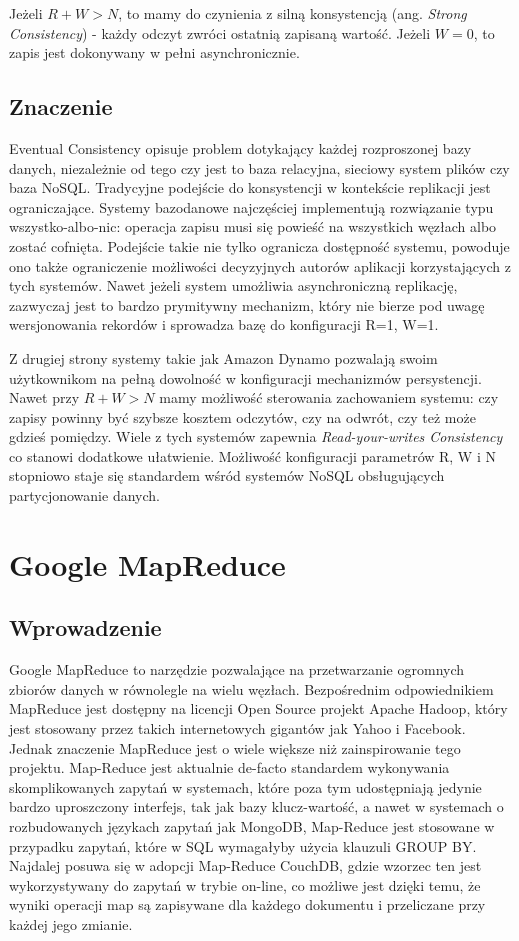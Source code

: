 Jeżeli $R+W>N$, to mamy do czynienia z silną konsystencją (ang. \emph{Strong Consistency}) - każdy odczyt zwróci ostatnią zapisaną wartość.
Jeżeli $W = 0$, to zapis jest dokonywany w pełni asynchronicznie.

\subsection*{Znaczenie}

Eventual Consistency opisuje problem dotykający każdej rozproszonej bazy danych, niezależnie od tego czy jest to baza relacyjna, sieciowy system plików czy baza NoSQL.
Tradycyjne podejście do konsystencji w kontekście replikacji jest ograniczające.
Systemy bazodanowe najczęściej implementują rozwiązanie typu wszystko-albo-nic: operacja zapisu musi się powieść na wszystkich węzłach albo zostać cofnięta.
Podejście takie nie tylko ogranicza dostępność systemu, powoduje ono także ograniczenie możliwości decyzyjnych autorów aplikacji korzystających z tych systemów.
Nawet jeżeli system umożliwia asynchroniczną replikację, zazwyczaj jest to bardzo prymitywny mechanizm, który nie bierze pod uwagę wersjonowania rekordów i sprowadza bazę do konfiguracji R=1, W=1.

Z drugiej strony systemy takie jak Amazon Dynamo pozwalają swoim użytkownikom na pełną dowolność w konfiguracji mechanizmów persystencji.
Nawet przy $R+W>N$ mamy możliwość sterowania zachowaniem systemu: czy zapisy powinny być szybsze kosztem odczytów, czy na odwrót, czy też może gdzieś pomiędzy.
Wiele z tych systemów zapewnia \emph{Read-your-writes Consistency} co stanowi dodatkowe ułatwienie.
Możliwość konfiguracji parametrów R, W i N stopniowo staje się standardem wśród systemów NoSQL obsługujących partycjonowanie danych.

\section{Google MapReduce}
\label{sec:google-map-reduce}

\subsection*{Wprowadzenie}

Google MapReduce to narzędzie pozwalające na przetwarzanie ogromnych zbiorów danych w równolegle na wielu węzłach.
Bezpośrednim odpowiednikiem MapReduce jest dostępny na licencji Open Source projekt Apache Hadoop, który jest stosowany przez takich internetowych gigantów jak Yahoo i Facebook.
Jednak znaczenie MapReduce jest o wiele większe niż zainspirowanie tego projektu.
Map-Reduce jest aktualnie de-facto standardem wykonywania skomplikowanych zapytań w systemach, które poza tym udostępniają jedynie bardzo uproszczony interfejs, tak jak bazy klucz-wartość, a nawet w systemach o rozbudowanych językach zapytań jak MongoDB, Map-Reduce jest stosowane w przypadku zapytań, które w SQL wymagałyby użycia klauzuli GROUP BY.
Najdalej posuwa się w adopcji Map-Reduce CouchDB, gdzie wzorzec ten jest wykorzystywany do zapytań w trybie on-line, co możliwe jest dzięki temu, że wyniki operacji map są zapisywane dla każdego dokumentu i przeliczane przy każdej jego zmianie. 

